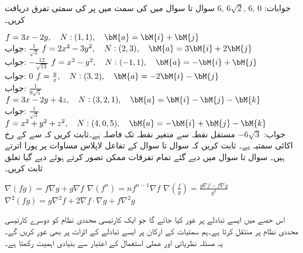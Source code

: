 جوابات:
$6,\,6\sqrt{2},\, 6,\, 0$
سوال  تا سوال  میں  کی سمت میں  پر  کی سمتی تفرق دریافت کریں۔

\quad
$f=3x-2y,\quad N:(1,1),\quad \bM{a}=\bM{i}+\bM{j}$\\
جواب:\quad
$\tfrac{1}{\sqrt{2}}$
\quad
$f=2x^2-3y^2,\quad N:(2,3),\quad \bM{a}=3\bM{i}+2\bM{j}$\\
جواب:\quad
$-\tfrac{12}{\sqrt{13}}$
\quad
$f=x^2-y^2,\quad N:(-1,1),\quad \bM{a}=-\bM{i}+\bM{j}$\\
جواب:\quad
$0$
\quad
$f=\frac{y}{x},\quad N:(3,2),\quad \bM{a}=-2\bM{i}-\bM{j}$\\
جواب:\quad
$\tfrac{1}{9\sqrt{5}}$
\quad
$f=3x-2y+4z,\quad N:(3,2,1),\quad \bM{a}=\bM{i}-\bM{j}-\bM{k}$\\
جواب:\quad
$\tfrac{1}{\sqrt{3}}$
\quad
$f=x^2+y^2+z^2,\quad N:(4,0,5),\quad \bM{a}=-\bM{i}+\bM{j}-\bM{k}$\\
جواب:\quad
$-6\sqrt{3}$
مستقل نقطہ  سے متغیر نقطہ  تک فاصلہ  ہے۔ثابت کریں کہ  سے   کے رخ اکائی سمتیہ   ہے۔  
ثابت کریں کہ سوال  تا سوال  کے تفاعل لاپلاس مساوات پر پورا اترتے ہیں۔
سوال  تا سوال  میں دیے گئے تمام تفرقات ممکن تصور کرتے ہوئے دیے گیا تعلق ثابت کریں۔

\quad
$\nabla(fg)=f\nabla g+g\nabla f$
\quad
$\nabla(f^n)=nf^{n-1}\nabla f$
\quad
$\nabla(\frac{f}{g})=\frac{g\nabla f-f\nabla g}{g^2}$
\quad
$\nabla^2(fg)=g\nabla^2f+2\nabla f\cdot \nabla g+f\nabla^2 g$

اس حصے میں ایسے تبادلے پر غور کیا جائے گا جو ایک کارتیسی محددی نظام کو دوسرے کارتیسی محددی نظام پر منتقل کرتا ہے۔ہم سمتیات کے ارکان پر ایسے تبادلے کے اثرات پر بھی غور کریں گے۔یہ مسئلہ نظریاتی اور عملی استعمال کے اعتبار  سے بنیادی اہمیت رکھتا ہے۔

